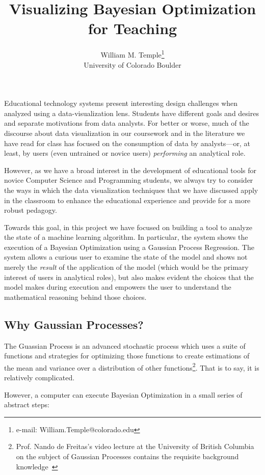 \documentclass{vgtc}                          %
\title{Visualizing Bayesian Optimization for Teaching}
\author{William M. Temple\thanks{e-mail: William.Temple@colorado.edu}\\ %
        \scriptsize University of Colorado Boulder
}%
\begin{document}

\maketitle

Educational technology systems present interesting design challenges when
analyzed using a data-visualization lens.  Students have different goals
and desires and separate motivations from data analysts. For better or
worse, much of the discourse about data visualization in our coursework
and in the literature we have read for class has focused on the consumption
of data by analysts---or, at least, by users (even untrained or novice users)
\textit{performing} an analytical role.

However, as we have a broad interest in the development of educational tools for
novice Computer Science and Programming students, we always try to consider the
ways in which the data visualization techniques that we have discussed apply in
the classroom to enhance the educational experience and provide for a more
robust pedagogy.

Towards this goal, in this project we have focused on building a tool to analyze
the state of a machine learning algorithm. In particular, the system shows the
execution of a Bayesian Optimization using a Gaussian Process Regression. The
system allows a curious user to examine the state of the model and shows not
merely the \textit{result} of the application of the model (which would be the
primary interest of users in analytical roles), but also makes evident the
choices that the model makes during execution and empowers the user to
understand the mathematical reasoning behind those choices.

\subsection{Why Gaussian Processes?}

The Guassian Process is an advanced stochastic process which uses a suite of
functions and strategies for optimizing those functions to create estimations
of the mean and variance over a distribution of other functions\footnote{Prof.
Nando de Freitas's video lecture at the University of British Columbia on the
subject of Gaussian Processes contains the requisite background
knowledge~\cite{nando}}. That is to say, it is relatively complicated.

However, a computer can execute Bayesian Optimization in a small series of abstract steps:
\end{document}
